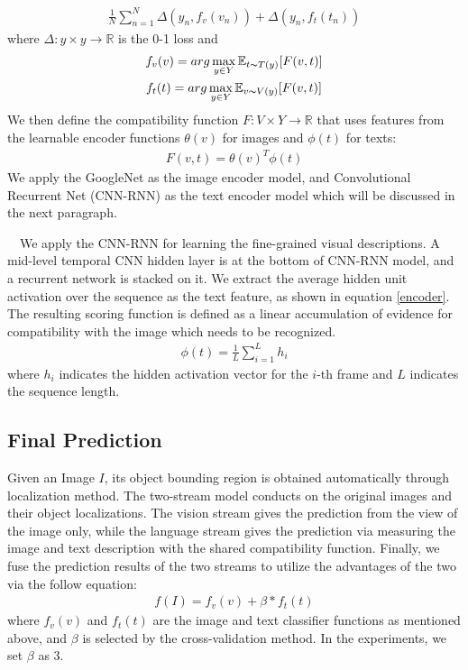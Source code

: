 \documentclass[10pt,twocolumn,letterpaper]{article}
\begin{document}
\begin{gather}
\frac{1}{N} \sum_{n=1}^N \Delta (y_n,f_v(v_n))+ \Delta (y_n,f_t(t_n))
\end{gather}
where $\Delta : y \times y \to \mathbb{R}$ is the 0-1 loss and
\begin{gather}
f_v(v)=arg \max_{y \in Y} \mathbb{E}_{t \thicksim T(y)}[F(v,t)] \\
f_t(t)=arg \max_{y \in Y} \mathbb{E}_{v \thicksim V(y)}[F(v,t)]
\end{gather}
We then define the compatibility function $F : V \times Y \to \mathbb{R}$ that uses features from the learnable encoder functions $\theta (v)$ for images and $\phi (t)$ for texts:
\begin{gather}
F(v,t)= \theta (v)^T \phi(t)
\end{gather}
We apply the GoogleNet \cite{googlenet} as the image encoder model, and Convolutional Recurrent Net (CNN-RNN) \cite{deeprepresentations} as the text encoder model which will be discussed in the next paragraph.
\par
{} \ \ We apply the CNN-RNN \cite{deeprepresentations} for learning the fine-grained visual descriptions. A mid-level temporal CNN hidden layer is at the bottom of CNN-RNN model, and a recurrent network is stacked on it. We extract the average hidden unit activation over the sequence as the text feature, as shown in equation \ref{encoder}. The resulting scoring function is defined as a linear accumulation of evidence for compatibility with the image which needs to be recognized.
\begin{gather}
\phi(t)= \frac{1}{L}\sum_{i=1}^L h_i
\label{encoder}
\end{gather}
where $h_i$ indicates the hidden activation vector for the $i$-th frame and $L$ indicates the sequence length.

\subsection{Final Prediction}
Given an Image $I$, its object bounding region is obtained automatically through localization method. The two-stream model conducts on the original images and their object localizations. The vision stream gives the prediction from the view of the image only, while the language stream gives the prediction via measuring the image and text description with the shared compatibility function. Finally, we fuse the prediction results of the two streams to utilize the advantages of the two via the follow equation:
\begin{gather}
f(I)= f_v(v) + \beta * f_t(t)
\end{gather}
where $f_v(v)$ and $f_t(t)$ are the image and text classifier functions as mentioned above, and $\beta$ is selected by the cross-validation method. In the experiments, we set $\beta$ as 3.
\end{document}
